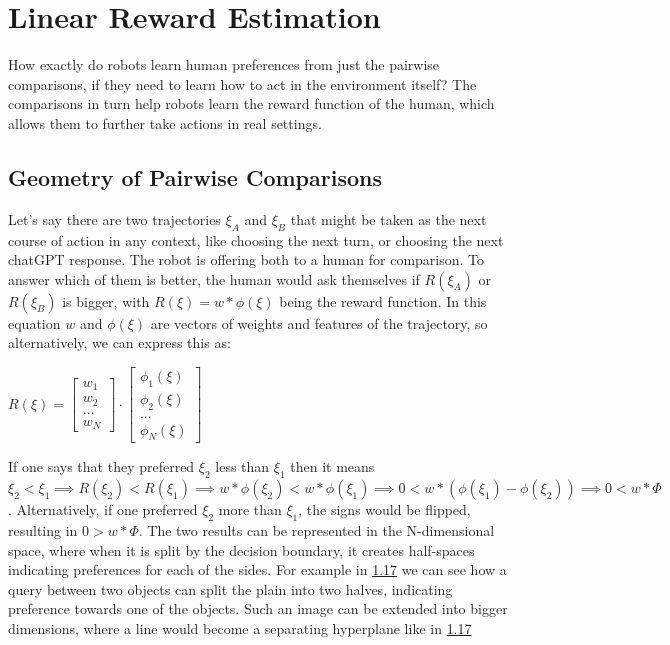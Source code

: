 \documentclass[
  letterpaper,
  DIV=11,
  numbers=noendperiod,
  oneside]{scrreprt}
\theoremstyle{remark}
\begin{document}
\section{Linear Reward Estimation}\label{linear-reward-estimation}

How exactly do robots learn human preferences from just the pairwise
comparisons, if they need to learn how to act in the environment itself?
The comparisons in turn help robots learn the reward function of the
human, which allows them to further take actions in real settings.

\subsection{Geometry of Pairwise
Comparisons}\label{geometry-of-pairwise-comparisons}

Let's say there are two trajectories \(\xi_A\) and \(\xi_B\) that might
be taken as the next course of action in any context, like choosing the
next turn, or choosing the next chatGPT response. The robot is offering
both to a human for comparison. To answer which of them is better, the
human would ask themselves if \(R(\xi_A)\) or \(R(\xi_B)\) is bigger,
with \(R(\xi) = w * \phi(\xi)\) being the reward function. In this
equation \(w\) and \(\phi(\xi)\) are vectors of weights and features of
the trajectory, so alternatively, we can express this as:

\(R(\xi) = \begin{bmatrix} w_1 \\ w_2 \\ ... \\ w_N \end{bmatrix} \cdot \begin{bmatrix} \phi_1(\xi) \\ \phi_2(\xi) \\ ... \\ \phi_N(\xi) \end{bmatrix}\)

If one says that they preferred \(\xi_2\) less than \(\xi_1\) then it
means
\(\xi_2 < \xi_1 \implies R(\xi_2) < R(\xi_1) \implies w * \phi(\xi_2) < w * \phi(\xi_1) \implies 0 < w * (\phi(\xi_1) - \phi(\xi_2)) \implies 0 < w * \Phi\).
Alternatively, if one preferred \(\xi_2\) more than \(\xi_1\), the signs
would be flipped, resulting in \(0 > w * \Phi\). The two results can be
represented in the N-dimensional space, where when it is split by the
decision boundary, it creates half-spaces indicating preferences for
each of the sides. For example in \hyperref[fig:2dcomp]{1.17} we can see
how a query between two objects can split the plain into two halves,
indicating preference towards one of the objects. Such an image can be
extended into bigger dimensions, where a line would become a separating
hyperplane like in \hyperref[fig:2dcomp]{1.17}
\end{document}
